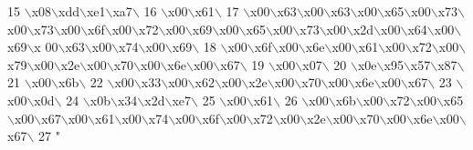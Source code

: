 \begin{DoxyCode}
15 \textcolor{stringliteral}{\(\backslash\)x08\(\backslash\)xdd\(\backslash\)xe1\(\backslash\)xa7\(\backslash\)}
16 \textcolor{stringliteral}{\(\backslash\)x00\(\backslash\)x61\(\backslash\)}
17 \textcolor{stringliteral}{\(\backslash\)x00\(\backslash\)x63\(\backslash\)x00\(\backslash\)x63\(\backslash\)x00\(\backslash\)x65\(\backslash\)x00\(\backslash\)x73\(\backslash\)x00\(\backslash\)x73\(\backslash\)x00\(\backslash\)x6f\(\backslash\)x00\(\backslash\)x72\(\backslash\)x00\(\backslash\)x69\(\backslash\)x00\(\backslash\)x65\(\backslash\)x00\(\backslash\)x73\(\backslash\)x00\(\backslash\)x2d\(\backslash\)x00\(\backslash\)x64\(\backslash\)x00\(\backslash\)x69\(\backslash\)x
      00\(\backslash\)x63\(\backslash\)x00\(\backslash\)x74\(\backslash\)x00\(\backslash\)x69\(\backslash\)}
18 \textcolor{stringliteral}{\(\backslash\)x00\(\backslash\)x6f\(\backslash\)x00\(\backslash\)x6e\(\backslash\)x00\(\backslash\)x61\(\backslash\)x00\(\backslash\)x72\(\backslash\)x00\(\backslash\)x79\(\backslash\)x00\(\backslash\)x2e\(\backslash\)x00\(\backslash\)x70\(\backslash\)x00\(\backslash\)x6e\(\backslash\)x00\(\backslash\)x67\(\backslash\)}
19 \textcolor{stringliteral}{\(\backslash\)x00\(\backslash\)x07\(\backslash\)}
20 \textcolor{stringliteral}{\(\backslash\)x0e\(\backslash\)x95\(\backslash\)x57\(\backslash\)x87\(\backslash\)}
21 \textcolor{stringliteral}{\(\backslash\)x00\(\backslash\)x6b\(\backslash\)}
22 \textcolor{stringliteral}{\(\backslash\)x00\(\backslash\)x33\(\backslash\)x00\(\backslash\)x62\(\backslash\)x00\(\backslash\)x2e\(\backslash\)x00\(\backslash\)x70\(\backslash\)x00\(\backslash\)x6e\(\backslash\)x00\(\backslash\)x67\(\backslash\)}
23 \textcolor{stringliteral}{\(\backslash\)x00\(\backslash\)x0d\(\backslash\)}
24 \textcolor{stringliteral}{\(\backslash\)x0b\(\backslash\)x34\(\backslash\)x2d\(\backslash\)xe7\(\backslash\)}
25 \textcolor{stringliteral}{\(\backslash\)x00\(\backslash\)x61\(\backslash\)}
26 \textcolor{stringliteral}{\(\backslash\)x00\(\backslash\)x6b\(\backslash\)x00\(\backslash\)x72\(\backslash\)x00\(\backslash\)x65\(\backslash\)x00\(\backslash\)x67\(\backslash\)x00\(\backslash\)x61\(\backslash\)x00\(\backslash\)x74\(\backslash\)x00\(\backslash\)x6f\(\backslash\)x00\(\backslash\)x72\(\backslash\)x00\(\backslash\)x2e\(\backslash\)x00\(\backslash\)x70\(\backslash\)x00\(\backslash\)x6e\(\backslash\)x00\(\backslash\)x67\(\backslash\)}
27 \textcolor{stringliteral}{"}
\end{DoxyCode}
\hypertarget{namespacestates__rc2_ae217b314fc99236d927478705d869fa0}{}
